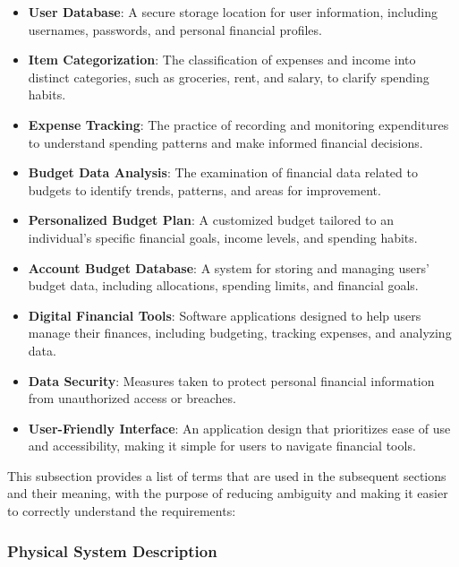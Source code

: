 \documentclass[12pt]{article}
\begin{document}
\begin{itemize}
  \item \textbf{User Database}: A secure storage location for user information, including usernames, passwords, and personal financial profiles.
  \item \textbf{Item Categorization}: The classification of expenses and income into distinct categories, such as groceries, rent, and salary, to clarify spending habits.
  \item \textbf{Expense Tracking}: The practice of recording and monitoring expenditures to understand spending patterns and make informed financial decisions.
  \item \textbf{Budget Data Analysis}: The examination of financial data related to budgets to identify trends, patterns, and areas for improvement.
  \item \textbf{Personalized Budget Plan}: A customized budget tailored to an individual's specific financial goals, income levels, and spending habits.
  \item \textbf{Account Budget Database}: A system for storing and managing users' budget data, including allocations, spending limits, and financial goals.
  \item \textbf{Digital Financial Tools}: Software applications designed to help users manage their finances, including budgeting, tracking expenses, and analyzing data.
  \item \textbf{Data Security}: Measures taken to protect personal financial information from unauthorized access or breaches.
  \item \textbf{User-Friendly Interface}: An application design that prioritizes ease of use and accessibility, making it simple for users to navigate financial tools.
\end{itemize}


This subsection provides a list of terms that are used in the subsequent
sections and their meaning, with the purpose of reducing ambiguity and making it
easier to correctly understand the requirements:



\subsubsection{Physical System Description} \label{sec_phySystDescrip}
\end{document}
